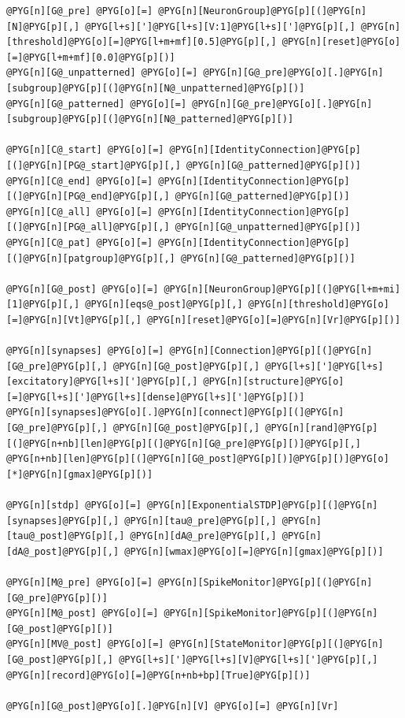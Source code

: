\documentclass[letterpaper,10pt,english]{manual}
\begin{document}
\begin{Verbatim}[commandchars=@\[\]]
@PYG[n][G@_pre] @PYG[o][=] @PYG[n][NeuronGroup]@PYG[p][(]@PYG[n][N]@PYG[p][,] @PYG[l+s][']@PYG[l+s][V:1]@PYG[l+s][']@PYG[p][,] @PYG[n][threshold]@PYG[o][=]@PYG[l+m+mf][0.5]@PYG[p][,] @PYG[n][reset]@PYG[o][=]@PYG[l+m+mf][0.0]@PYG[p][)]
@PYG[n][G@_unpatterned] @PYG[o][=] @PYG[n][G@_pre]@PYG[o][.]@PYG[n][subgroup]@PYG[p][(]@PYG[n][N@_unpatterned]@PYG[p][)]
@PYG[n][G@_patterned] @PYG[o][=] @PYG[n][G@_pre]@PYG[o][.]@PYG[n][subgroup]@PYG[p][(]@PYG[n][N@_patterned]@PYG[p][)]

@PYG[n][C@_start] @PYG[o][=] @PYG[n][IdentityConnection]@PYG[p][(]@PYG[n][PG@_start]@PYG[p][,] @PYG[n][G@_patterned]@PYG[p][)]
@PYG[n][C@_end] @PYG[o][=] @PYG[n][IdentityConnection]@PYG[p][(]@PYG[n][PG@_end]@PYG[p][,] @PYG[n][G@_patterned]@PYG[p][)]
@PYG[n][C@_all] @PYG[o][=] @PYG[n][IdentityConnection]@PYG[p][(]@PYG[n][PG@_all]@PYG[p][,] @PYG[n][G@_unpatterned]@PYG[p][)]
@PYG[n][C@_pat] @PYG[o][=] @PYG[n][IdentityConnection]@PYG[p][(]@PYG[n][patgroup]@PYG[p][,] @PYG[n][G@_patterned]@PYG[p][)]

@PYG[n][G@_post] @PYG[o][=] @PYG[n][NeuronGroup]@PYG[p][(]@PYG[l+m+mi][1]@PYG[p][,] @PYG[n][eqs@_post]@PYG[p][,] @PYG[n][threshold]@PYG[o][=]@PYG[n][Vt]@PYG[p][,] @PYG[n][reset]@PYG[o][=]@PYG[n][Vr]@PYG[p][)]

@PYG[n][synapses] @PYG[o][=] @PYG[n][Connection]@PYG[p][(]@PYG[n][G@_pre]@PYG[p][,] @PYG[n][G@_post]@PYG[p][,] @PYG[l+s][']@PYG[l+s][excitatory]@PYG[l+s][']@PYG[p][,] @PYG[n][structure]@PYG[o][=]@PYG[l+s][']@PYG[l+s][dense]@PYG[l+s][']@PYG[p][)]
@PYG[n][synapses]@PYG[o][.]@PYG[n][connect]@PYG[p][(]@PYG[n][G@_pre]@PYG[p][,] @PYG[n][G@_post]@PYG[p][,] @PYG[n][rand]@PYG[p][(]@PYG[n+nb][len]@PYG[p][(]@PYG[n][G@_pre]@PYG[p][)]@PYG[p][,] @PYG[n+nb][len]@PYG[p][(]@PYG[n][G@_post]@PYG[p][)]@PYG[p][)]@PYG[o][*]@PYG[n][gmax]@PYG[p][)]

@PYG[n][stdp] @PYG[o][=] @PYG[n][ExponentialSTDP]@PYG[p][(]@PYG[n][synapses]@PYG[p][,] @PYG[n][tau@_pre]@PYG[p][,] @PYG[n][tau@_post]@PYG[p][,] @PYG[n][dA@_pre]@PYG[p][,] @PYG[n][dA@_post]@PYG[p][,] @PYG[n][wmax]@PYG[o][=]@PYG[n][gmax]@PYG[p][)]

@PYG[n][M@_pre] @PYG[o][=] @PYG[n][SpikeMonitor]@PYG[p][(]@PYG[n][G@_pre]@PYG[p][)]
@PYG[n][M@_post] @PYG[o][=] @PYG[n][SpikeMonitor]@PYG[p][(]@PYG[n][G@_post]@PYG[p][)]
@PYG[n][MV@_post] @PYG[o][=] @PYG[n][StateMonitor]@PYG[p][(]@PYG[n][G@_post]@PYG[p][,] @PYG[l+s][']@PYG[l+s][V]@PYG[l+s][']@PYG[p][,] @PYG[n][record]@PYG[o][=]@PYG[n+nb+bp][True]@PYG[p][)]

@PYG[n][G@_post]@PYG[o][.]@PYG[n][V] @PYG[o][=] @PYG[n][Vr]


\end{Verbatim}
\end{document}

